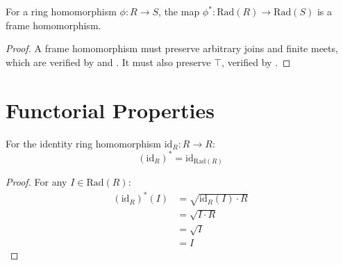 \begin{theorem}
  \label{thm:phi-star-frame-homomorphism}
  \leanok
  For a ring homomorphism $\phi: R \to S$, the map $\phi^*: \mathrm{Rad}(R) \to \mathrm{Rad}(S)$ is a frame homomorphism.
\end{theorem}

\begin{proof}
  \leanok
  A frame homomorphism must preserve arbitrary joins and finite meets, which are verified by 
  and . It must also preserve $\top$, verified by .
\end{proof}

\section{Functorial Properties}

\begin{lemma}
  \label{lemma:identity-homomorphism}
  \leanok
  For the identity ring homomorphism $\mathrm{id}_R : R \to R$:
  $$(\mathrm{id}_R)^* = \mathrm{id}_{\mathrm{Rad}(R)}$$
\end{lemma}

\begin{proof}
  \leanok
  For any $I \in \mathrm{Rad}(R)$:
  \begin{align*}
    (\mathrm{id}_R)^*(I) &= \sqrt{\mathrm{id}_R(I) \cdot R} \\
    &= \sqrt{I \cdot R} \\
    &= \sqrt{I} \\
    &= I
  \end{align*}
\end{proof}

